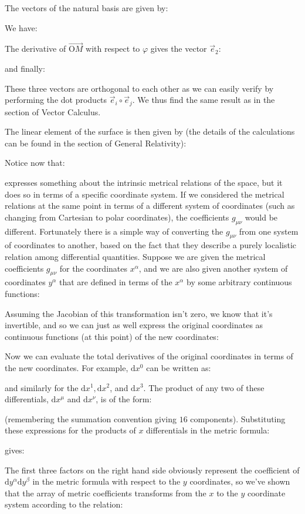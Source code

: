 	The vectors of the natural basis are given by:
	
	We have:
	
	The derivative of $\overrightarrow{\text{O}M}$ with respect to $\varphi$ gives the vector $\vec{e}_2$:
	
	and finally:
	
	These three vectors are orthogonal to each other as we can easily verify by performing the dot products $\vec{e}_i\circ\vec{e}_j$. We thus find the same result as in the section of Vector Calculus.
	
	The linear element of the surface is then given by (the details of the calculations can be found in the section of General Relativity):
	
	Notice now that:
	
	expresses something about the intrinsic metrical relations of the space, but it does so in terms of a specific coordinate system. If we considered the metrical relations at the same point in terms of a different system of coordinates (such as changing from Cartesian to polar coordinates), the coefficients $g_{\mu\nu}$ would be different. Fortunately there is a simple way of converting the $g_{\mu\nu}$ from one system of coordinates to another, based on the fact that they describe a purely localistic relation among differential quantities. Suppose we are given the metrical coefficients $g_{\mu\nu}$ for the coordinates $x^\alpha$, and we are also given another system of coordinates $y^\alpha$ that are defined in terms of the $x^\alpha$ by some arbitrary continuous functions:
	
	Assuming the Jacobian of this transformation isn't zero, we know that it's invertible, and so we can just as well express the original coordinates as continuous functions (at this point) of the new coordinates:
	
	Now we can evaluate the total derivatives of the original coordinates in terms of the new coordinates. For example, $\mathrm{d}x^0$ can be written as:
	
	and similarly for the $\mathrm{d}x^1, \mathrm{d}x^2$, and $\mathrm{d}x^3$. The product of any two of these differentials, $\mathrm{d}x^\mu$ and $\mathrm{d}x^\nu$, is of the form:
	
	(remembering the summation convention giving $16$ components). Substituting these expressions for the products of $x$ differentials in the metric formula:
	
	gives:
	
	The first three factors on the right hand side obviously represent the coefficient of $\mathrm{d}y^\alpha\mathrm{d}y^\beta$ in the metric formula with respect to the $y$ coordinates, so we've shown that the array of metric coefficients transforms from the $x$ to the $y$ coordinate system according to the relation:
	
